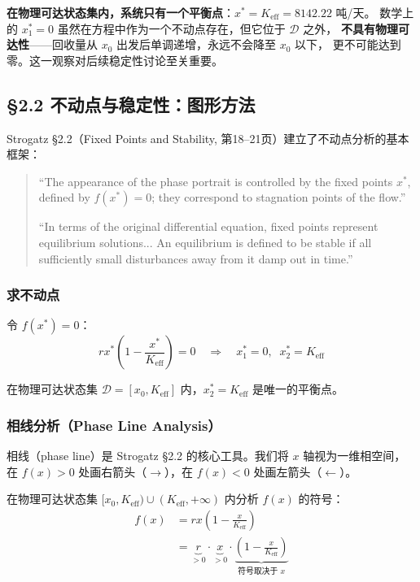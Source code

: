 \documentclass[12pt,a4paper]{article}
\begin{document}
\textbf{在物理可达状态集内，系统只有一个平衡点}：$x^* = K_{\text{eff}} = 8142.22$ 吨/天。
数学上的 $x^*_1 = 0$ 虽然在方程中作为一个不动点存在，但它位于 $\mathcal{D}$ 之外，
\textbf{不具有物理可达性}——回收量从 $x_0$ 出发后单调递增，永远不会降至 $x_0$ 以下，
更不可能达到零。这一观察对后续稳定性讨论至关重要。

\subsection{\S2.2 不动点与稳定性：图形方法}

Strogatz \S2.2（Fixed Points and Stability, 第18--21页）建立了不动点分析的基本框架：

\begin{quote}
\small
``The appearance of the phase portrait is controlled by the fixed points $x^*$, defined by
$f(x^*) = 0$; they correspond to stagnation points of the flow.''

\medskip
``In terms of the original differential equation, fixed points represent equilibrium solutions...
An equilibrium is defined to be stable if all sufficiently small disturbances away from it damp
out in time.''
\end{quote}

\subsubsection{求不动点}
令 $f(x^*) = 0$：
\begin{equation}
r x^* \left(1 - \frac{x^*}{K_{\text{eff}}}\right) = 0
\quad\Rightarrow\quad x^*_1 = 0,\;\; x^*_2 = K_{\text{eff}}
\end{equation}

在物理可达状态集 $\mathcal{D} = [x_0, K_{\text{eff}}]$ 内，$x^*_2 = K_{\text{eff}}$ 是唯一的平衡点。

\subsubsection{相线分析（Phase Line Analysis）}
相线（phase line）是 Strogatz \S2.2 的核心工具。我们将 $x$ 轴视为一维相空间，
在 $f(x) > 0$ 处画右箭头（$\to$），在 $f(x) < 0$ 处画左箭头（$\leftarrow$）。

在物理可达状态集 $[x_0, K_{\text{eff}}) \cup (K_{\text{eff}}, +\infty)$ 内分析 $f(x)$ 的符号：
\begin{align}
f(x) &= r x \left(1 - \frac{x}{K_{\text{eff}}}\right) \nonumber\\
     &= \underbrace{r}_{>0} \cdot \underbrace{x}_{>0}
        \cdot \underbrace{\left(1 - \frac{x}{K_{\text{eff}}}\right)}_{\text{符号取决于 }x}
\end{align}
\end{document}
